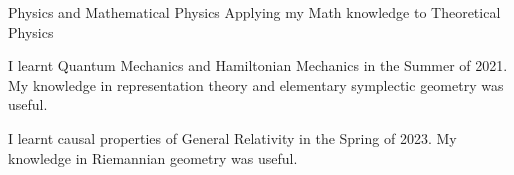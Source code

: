 \HeadingItemListStart
	\HeadingItem
		{Physics and Mathematical Physics}{}
		{Applying my Math knowledge to Theoretical Physics}{}
		\ItemListStart
			\item I learnt Quantum Mechanics and Hamiltonian Mechanics in the Summer of 2021. My knowledge in representation theory and elementary symplectic geometry was useful.
			\item I learnt causal properties of General Relativity in the Spring of 2023. My knowledge in Riemannian geometry was useful.
		\ItemListEnd
	
\HeadingItemListEnd

